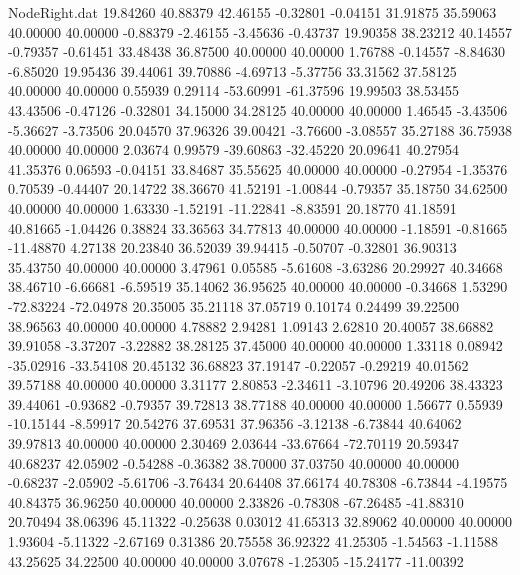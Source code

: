 \begin{filecontents}{NodeRight.dat}
  19.84260   40.88379   42.46155    -0.32801   -0.04151   31.91875   35.59063   40.00000   40.00000   -0.88379   -2.46155   -3.45636   -0.43737
  19.90358   38.23212   40.14557    -0.79357   -0.61451   33.48438   36.87500   40.00000   40.00000    1.76788   -0.14557   -8.84630   -6.85020
  19.95436   39.44061   39.70886    -4.69713   -5.37756   33.31562   37.58125   40.00000   40.00000    0.55939    0.29114  -53.60991  -61.37596
  19.99503   38.53455   43.43506    -0.47126   -0.32801   34.15000   34.28125   40.00000   40.00000    1.46545   -3.43506   -5.36627   -3.73506
  20.04570   37.96326   39.00421    -3.76600   -3.08557   35.27188   36.75938   40.00000   40.00000    2.03674    0.99579  -39.60863  -32.45220
  20.09641   40.27954   41.35376     0.06593   -0.04151   33.84687   35.55625   40.00000   40.00000   -0.27954   -1.35376    0.70539   -0.44407
  20.14722   38.36670   41.52191    -1.00844   -0.79357   35.18750   34.62500   40.00000   40.00000    1.63330   -1.52191  -11.22841   -8.83591
  20.18770   41.18591   40.81665    -1.04426    0.38824   33.36563   34.77813   40.00000   40.00000   -1.18591   -0.81665  -11.48870    4.27138
  20.23840   36.52039   39.94415    -0.50707   -0.32801   36.90313   35.43750   40.00000   40.00000    3.47961    0.05585   -5.61608   -3.63286
  20.29927   40.34668   38.46710    -6.66681   -6.59519   35.14062   36.95625   40.00000   40.00000   -0.34668    1.53290  -72.83224  -72.04978
  20.35005   35.21118   37.05719     0.10174    0.24499   39.22500   38.96563   40.00000   40.00000    4.78882    2.94281    1.09143    2.62810
  20.40057   38.66882   39.91058    -3.37207   -3.22882   38.28125   37.45000   40.00000   40.00000    1.33118    0.08942  -35.02916  -33.54108
  20.45132   36.68823   37.19147    -0.22057   -0.29219   40.01562   39.57188   40.00000   40.00000    3.31177    2.80853   -2.34611   -3.10796
  20.49206   38.43323   39.44061    -0.93682   -0.79357   39.72813   38.77188   40.00000   40.00000    1.56677    0.55939  -10.15144   -8.59917
  20.54276   37.69531   37.96356    -3.12138   -6.73844   40.64062   39.97813   40.00000   40.00000    2.30469    2.03644  -33.67664  -72.70119
  20.59347   40.68237   42.05902    -0.54288   -0.36382   38.70000   37.03750   40.00000   40.00000   -0.68237   -2.05902   -5.61706   -3.76434
  20.64408   37.66174   40.78308    -6.73844   -4.19575   40.84375   36.96250   40.00000   40.00000    2.33826   -0.78308  -67.26485  -41.88310
  20.70494   38.06396   45.11322    -0.25638    0.03012   41.65313   32.89062   40.00000   40.00000    1.93604   -5.11322   -2.67169    0.31386
  20.75558   36.92322   41.25305    -1.54563   -1.11588   43.25625   34.22500   40.00000   40.00000    3.07678   -1.25305  -15.24177  -11.00392

\end{filecontents}
